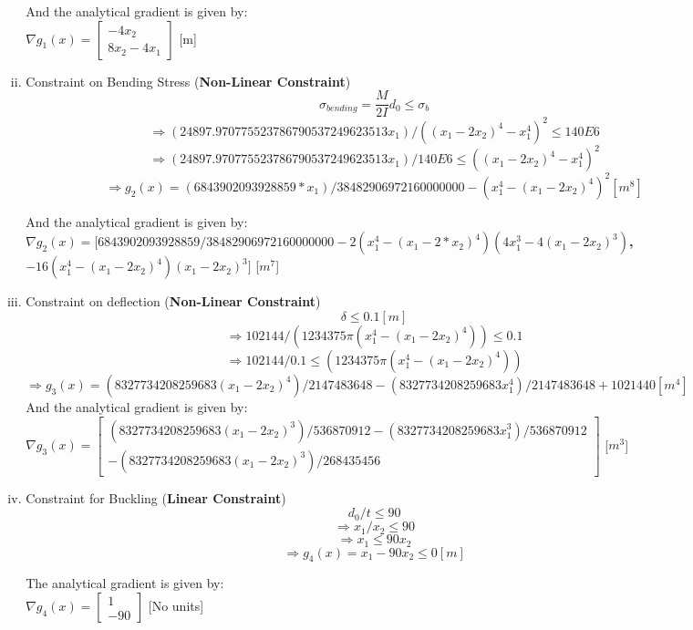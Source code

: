 \documentclass[12pt]{article}
\begin{document}
\begin{enumerate}[I]
\begin{enumerate}[1)]
\begin{enumerate}[a)]
\begin{enumerate}[i)]
And the analytical gradient is given by:\\
$\nabla g_1(x) = \begin{bmatrix}-4x_2\\ 8x_2-4x_1 \end{bmatrix}$ [m]\\

            \item Constraint on Bending Stress (\textbf{Non-Linear Constraint})\\
$$\sigma_{bending}=\frac{M}{2I}d_0 \leq \sigma_b$$
$$\Rightarrow  (24897.970775523786790537249623513x_1)/((x_1 - 2x_2)^4 - x_1^4)^2\leq 140E6$$
$$\Rightarrow  (24897.970775523786790537249623513x_1)/140E6 \leq ((x_1 - 2x_2)^4 - x_1^4)^2$$
$$\Rightarrow g_2(x)= (6843902093928859*x_1)/38482906972160000000 - (x_1^4 - (x_1 - 2x_2)^4)^2[m^8]$$

And the analytical gradient is given by:\\
$\nabla g_2(x) = [6843902093928859/38482906972160000000 - 2(x_1^4 - (x_1 - 2*x_2)^4)(4x_1^3 - 4(x_1 - 2x_2)^3)$\textbf{,}$
-16(x_1^4 - (x_1 - 2x_2)^4)(x_1 - 2x_2)^3]
$ [$m^7$]\\


    \item Constraint on deflection (\textbf{Non-Linear Constraint})\\
$$\delta\leq0.1[m]$$
$$\Rightarrow 102144/(1234375\pi(x_1^4 - (x_1 - 2x_2)^4))\leq 0.1$$
$$\Rightarrow 102144/0.1 \leq (1234375\pi(x_1^4 - (x_1 - 2x_2)^4)) $$
$\Rightarrow g_3(x)= (8327734208259683(x_1 - 2x_2)^4)/2147483648 - (8327734208259683x_1^4)/2147483648 + 1021440 [m^4]$\\

And the analytical gradient is given by:\\
$\nabla g_3(x) = \begin{bmatrix}
(8327734208259683(x_1 - 2x_2)^3)/536870912 - (8327734208259683x_1^3)/536870912\\
-(8327734208259683(x_1 - 2x_2)^3)/268435456
\end{bmatrix}
$ [$m^3$]\\

\item Constraint for Buckling (\textbf{Linear Constraint})\\
$$d_0/t\leq90$$
$$\Rightarrow x_1/x_2\leq90$$
$$\Rightarrow x_1\leq90x_2$$
$$\Rightarrow g_4(x)=x_1- 90x_2\leq0 [m]$$

The analytical gradient is given by:\\
$\nabla g_4(x) = \begin{bmatrix}
1\\
-90
\end{bmatrix}
$ [No units]\\


\end{enumerate}
\end{enumerate}
\end{enumerate}
\end{enumerate}
\end{document}
